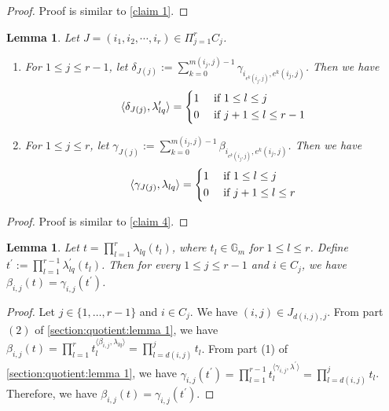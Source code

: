 \documentclass[12pt,reqno]{amsart}
\numberwithin{equation}{section}
\newtheorem{lemma}[theorem]{Lemma}
\theoremstyle{definition}
\begin{document}
\begin{proof}Proof is similar to \cref{claim 1}.
\end{proof}
\begin{lemma}\label{section:quotient:lemma 7}Let $J=(i_{1},i_{2},\cdots,i_{r})\in\Pi_{j=1}^{r}C_{j}$. 
	\begin{enumerate}
		\item 
		For $1\leq j\leq r-1$, 
		let $\delta_{J(j)}:=\sum_{k=0}^{m(i_{j},j)-1}\gamma_{i_{e^{k}(i_{j},j)},e^{k}(i_{j},j)}$. Then we have 
		\begin{align*}
			\langle\delta_{J(j)},\lambda^{\prime}_{lq}\rangle=\begin{dcases}
				1& \text{ if $1\leq l\leq j$}\\
				0& \text{ if $j+1\leq l\leq r-1$}
			\end{dcases}
		\end{align*}
		\item 	For $1\leq j\leq r$, 
		let $\gamma_{J(j)}:=\sum_{k=0}^{m(i_{j},j)-1}\beta_{i_{e^{k}(i_{j},j)},e^{k}(i_{j},j)}$. Then we have 
		\begin{align*}
			\langle\gamma_{J(j)},\lambda_{lq}\rangle=\begin{dcases}
				1& \text{ if $1\leq l\leq j$}\\
				0& \text{ if $j+1\leq l\leq r$}
			\end{dcases}
		\end{align*}
	\end{enumerate}
\end{lemma}
\begin{proof} Proof is similar to \cref{claim 4}. 
\end{proof}
\begin{lemma}\label{section:quotient lemma 3}
	Let $t=\prod_{l=1}^{r}\lambda_{lq}(t_{l})$, where $t_{l}\in \mathbb{G}_{m}$ for $1\leq l\leq r$. Define $t^{\prime}:=\prod_{l=1}^{r-1}\lambda^{\prime}_{lq}(t_{l})$. Then for every $1\leq j\leq r-1$ and $i\in C_{j}$, we have $\beta_{i,j}(t)=\gamma_{i,j}(t^{\prime})$.
\end{lemma}
\begin{proof}
	Let $j\in\{1,\ldots, r-1\}$ and $i\in C_{j}$. We have $(i,j)\in J_{d(i,j),j}$. From part $(2)$ of \cref{section:quotient:lemma 1}, we have $\beta_{i,j}(t)=\prod_{ l=1}^{r}t_{l}^{\langle\beta_{i,j},\lambda_{lq}\rangle}=\prod_{l=d(i,j)}^{j}t_{l}$. From part (1) of \cref{section:quotient:lemma 1}, we have $\gamma_{i,j}(t^{\prime})=\prod_{l=1}^{r-1}t_{l}^{\langle\gamma_{i,j},\lambda^{\prime}\rangle}=\prod_{l=d(i,j)}^{j}t_{l}$.
	Therefore, we have $\beta_{i,j}(t)=\gamma_{i,j}(t^{\prime})$. 
\end{proof}
\end{document}
